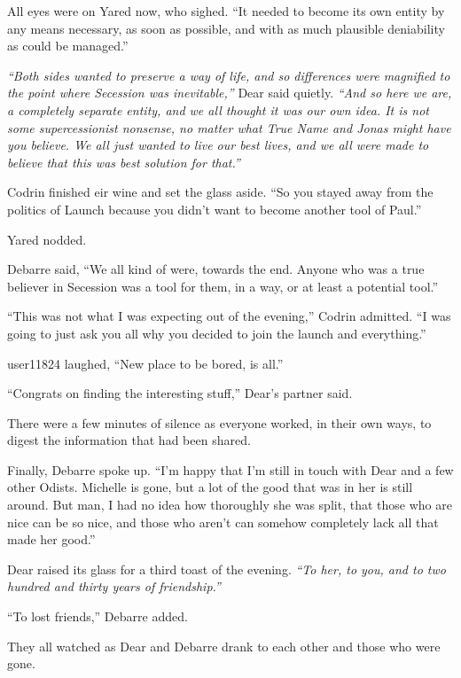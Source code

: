 All eyes were on Yared now, who sighed. ``It needed to become its own entity by any means necessary, as soon as possible, and with as much plausible deniability as could be managed.''

\emph{``Both sides wanted to preserve a way of life, and so differences were magnified to the point where Secession was inevitable,''} Dear said quietly. \emph{``And so here we are, a completely separate entity, and we all thought it was our own idea. It is not some supercessionist nonsense, no matter what True Name and Jonas might have you believe. We all just wanted to live our best lives, and we all were made to believe that this was best solution for that.''}

Codrin finished eir wine and set the glass aside. ``So you stayed away from the politics of Launch because you didn't want to become another tool of Paul.''

Yared nodded.

Debarre said, ``We all kind of were, towards the end. Anyone who was a true believer in Secession was a tool for them, in a way, or at least a potential tool.''

``This was not what I was expecting out of the evening,'' Codrin admitted. ``I was going to just ask you all why you decided to join the launch and everything.''

user11824 laughed, ``New place to be bored, is all.''

``Congrats on finding the interesting stuff,'' Dear's partner said.

There were a few minutes of silence as everyone worked, in their own ways, to digest the information that had been shared.

Finally, Debarre spoke up. ``I'm happy that I'm still in touch with Dear and a few other Odists. Michelle is gone, but a lot of the good that was in her is still around. But man, I had no idea how thoroughly she was split, that those who are nice can be so nice, and those who aren't can somehow completely lack all that made her good.''

Dear raised its glass for a third toast of the evening. \emph{``To her, to you, and to two hundred and thirty years of friendship.''}

``To lost friends,'' Debarre added.

They all watched as Dear and Debarre drank to each other and those who were gone.
